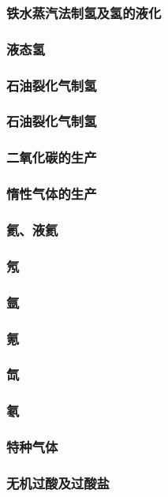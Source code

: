 \documentclass[UTF8]{../../ApplicationUniverse}
\begin{document}
        \subsubsection{铁水蒸汽法制氢及氢的液化}
        \subsubsection{液态氢}
        \subsubsection{石油裂化气制氢}
        \subsubsection{石油裂化气制氢}
    \subsubsection{二氧化碳的生产}
    \subsubsection{惰性气体的生产}
        \subsubsection{氦、液氦}
        \subsubsection{氖}
        \subsubsection{氩}
        \subsubsection{氪}
        \subsubsection{氙}
        \subsubsection{氡}
\subsubsection{特种气体}
\subsubsection{无机过酸及过酸盐}
\end{document}
